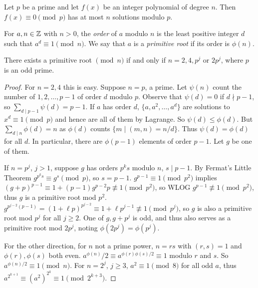 \documentclass[a4paper, 10pt, twocolumn]{amsart}
\begin{document}
\begin{theorem}[Lagrange]
  Let $p$ be a prime and let $f(x)$ be an integer polynomial of degree $n$. Then $f(x) \equiv 0 \pmod{p}$ has at most $n$ solutions modulo $p$.
\end{theorem}

\begin{definition}
  For $a, n \in \mathbb{Z}$ with $n > 0$, the \emph{order} of $a$ modulo $n$ is the least positive integer $d$ such that $a^d \equiv 1 \pmod{n}$. We say that $a$ is a \emph{primitive root} if its order is $\phi(n)$.
\end{definition}

\begin{theorem}
There exists a primitive root $\pmod{n}$ if and only if $n = 2, 4, p^j$ or $2p^j$, where $p$ is an odd prime.
\end{theorem}
\begin{proof}
For $n = 2, 4$ this is easy. Suppose $n = p$, a prime. Let $\psi(n)$ count the number of $1, 2, \dots, p - 1$ of order $d$ modulo $p$. Observe that $\psi(d) = 0$ if $d \nmid p - 1$, so $\sum_{d \mid p -1} \psi(d) = p - 1$. If $a$ has order $d$, $\{a, a^2, \dots, a^d\}$ are solutions to $x^d \equiv 1 \pmod{p}$ and hence are all of them by Lagrange. So $\psi(d) \leq \phi(d)$. But $\sum_{d \mid n} \phi(d) = n$ as $\phi(d)$ counts $\{m \mid (m, n) = n/d\}$. Thus $\psi(d) = \phi(d)$ for all $d$. In particular, there are $\phi(p - 1)$ elements of order $p - 1$. Let $g$ be one of them.

If $n = p^j$, $j > 1$, suppose $g$ has orders $p^ks$ modulo $n$, $s \mid p - 1$. By Fermat's Little Theorem $g^{p^k s} \equiv g^s \pmod{p}$, so $s = p - 1$. $g^{p - 1} \equiv 1 \pmod{p^2}$ implies $(g + p)^{p - 1} \equiv 1 + (p - 1)g^{p - 2}p \not \equiv 1 \pmod{p^2}$, so WLOG $g^{p -1} \not \equiv 1 \pmod{p^2}$, thus $g$ is a primitive root mod $p^2$. $g^{p^{j -2} (p - 1)} = (1 + \ell p)^{p^{j - 2}} \equiv 1 + \ell p ^{j - 1} \not \equiv 1 \pmod{p^j}$, so $g$ is also a primitive root mod $p^j$ for all $j \geq 2$. One of $g, g+p^j$ is odd, and thus also serves as a primitive root mod $2p^j$, noting $\phi(2p^j) = \phi(p^j)$.

For the other direction, for $n$ not a prime power, 
$n = rs$ with $(r, s) = 1$ and $\phi(r), \phi(s)$ both even. $a^{\phi(n)}/2 \equiv a^{\phi(r) \phi(s)/2} \equiv 1$ modulo $r$ and $s$. So $a^{\phi(n)/2} \equiv 1 \pmod{n}$. 
For $n = 2^j$, $j \geq 3$, $a^2 \equiv 1 \pmod{8}$ for all odd $a$, thus $a^{2^{k + 1}} \equiv (a^2)^{2^k} \equiv 1 \pmod{2^{k + 3}}$.
\end{proof}
\end{document}
